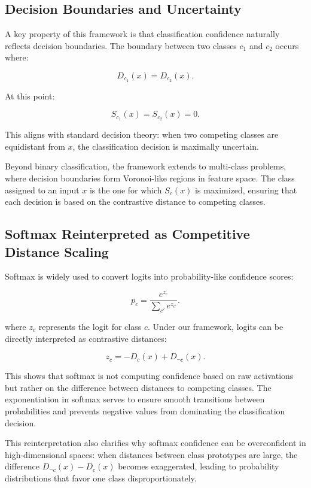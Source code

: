 \subsection{Decision Boundaries and Uncertainty}

A key property of this framework is that classification confidence naturally reflects decision boundaries. The boundary between two classes \( c_1 \) and \( c_2 \) occurs where:

\[
D_{c_1}(x) = D_{c_2}(x).
\]

At this point:

\[
S_{c_1}(x) = S_{c_2}(x) = 0.
\]

This aligns with standard decision theory: when two competing classes are equidistant from \( x \), the classification decision is maximally uncertain.

Beyond binary classification, the framework extends to multi-class problems, where decision boundaries form Voronoi-like regions in feature space. The class assigned to an input \( x \) is the one for which \( S_c(x) \) is maximized, ensuring that each decision is based on the contrastive distance to competing classes.

\subsection{Softmax Reinterpreted as Competitive Distance Scaling}

Softmax is widely used to convert logits into probability-like confidence scores:

\[
p_c = \frac{e^{z_c}}{\sum_{c'} e^{z_{c'}}}.
\]

where \( z_c \) represents the logit for class \( c \). Under our framework, logits can be directly interpreted as contrastive distances:

\[
z_c = -D_c(x) + D_{\neg c}(x).
\]

This shows that softmax is not computing confidence based on raw activations but rather on the difference between distances to competing classes. The exponentiation in softmax serves to ensure smooth transitions between probabilities and prevents negative values from dominating the classification decision.

This reinterpretation also clarifies why softmax confidence can be overconfident in high-dimensional spaces: when distances between class prototypes are large, the difference \( D_{\neg c}(x) - D_c(x) \) becomes exaggerated, leading to probability distributions that favor one class disproportionately.

